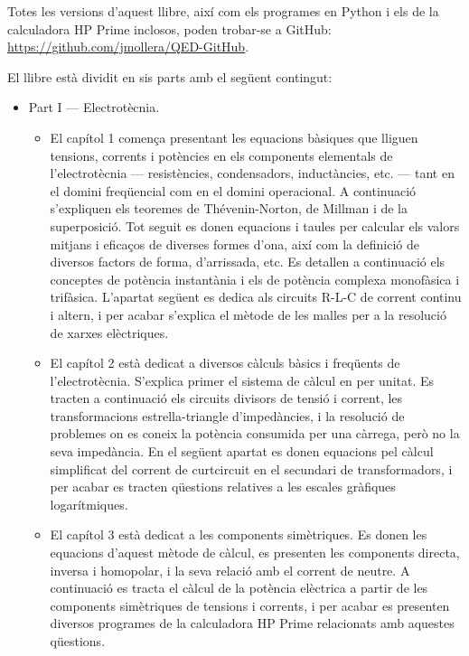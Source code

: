      Totes les versions d'aquest llibre, així com els programes en Python i els de la calculadora \textsf{HP Prime} inclosos, poden trobar-se a GitHub: \href{https://github.com/jmollera/QED-GitHub}{https://github.com/jmollera/QED-GitHub}.

	El llibre està dividit en sis parts amb el següent contingut:
	\begin{itemize}
		\item Part I --- Electrotècnia. 
		\begin{itemize}
			\item El capítol 1 comença presentant les equacions bàsiques que lliguen tensions, corrents i potències en els components elementals de l'electrotècnia --- resistències, condensadors, inductàncies, etc. --- tant en el domini freqüencial com en el domini operacional. A continuació s'expliquen els teoremes de Thévenin-Norton, de Millman i de la superposició. Tot seguit es donen equacions i taules per calcular els valors mitjans i eficaços de diverses formes d'ona, així com la definició de diversos factors de forma, d'arrissada, etc. Es detallen a continuació els conceptes de potència instantània i els de potència complexa monofàsica i trifàsica. L'apartat següent es dedica  als circuits R-L-C de corrent continu i altern, i per acabar s'explica el mètode de les malles per a la resolució de xarxes elèctriques.
			\item El capítol 2 està dedicat a diversos càlculs bàsics i freqüents de l'electrotècnia. S'explica primer el sistema de càlcul en per unitat. Es tracten a continuació els circuits  divisors de tensió i corrent,  les transformacions estrella-triangle d'impedàncies, i la resolució de problemes on es coneix la potència consumida per una càrrega, però no la seva impedància. En el següent apartat es donen equacions pel càlcul simplificat del corrent de curtcircuit en el secundari de transformadors, i per acabar es tracten  qüestions relatives a les  escales gràfiques logarítmiques.
			\item El capítol 3 està dedicat a les components simètriques. Es donen les equacions d'aquest mètode de càlcul, es presenten les components directa, inversa i homopolar, i la seva relació amb el corrent de neutre. A continuació es tracta el càlcul de la potència elèctrica a partir de les components simètriques de tensions i corrents, i per acabar es presenten diversos programes de la calculadora \textsf{HP Prime} relacionats amb aquestes qüestions.

\end{itemize}
\end{itemize}
